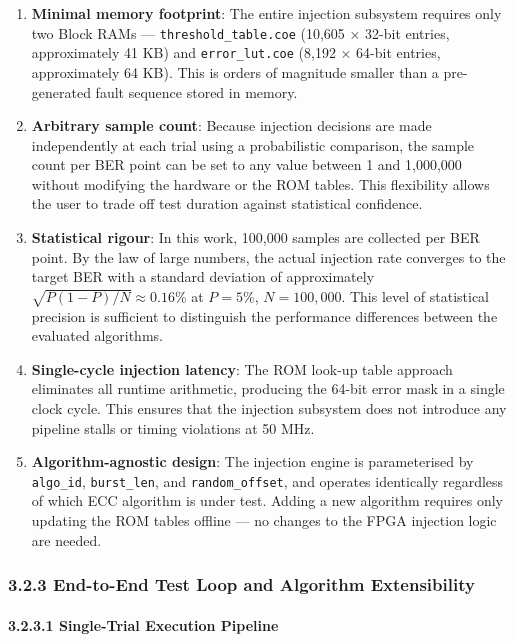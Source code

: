 \begin{enumerate}
\def\labelenumi{\arabic{enumi}.}
\item
  \textbf{Minimal memory footprint}: The entire injection subsystem
  requires only two Block RAMs --- \texttt{threshold\_table.coe} (10,605
  × 32-bit entries, approximately 41 KB) and \texttt{error\_lut.coe}
  (8,192 × 64-bit entries, approximately 64 KB). This is orders of
  magnitude smaller than a pre-generated fault sequence stored in
  memory.
\item
  \textbf{Arbitrary sample count}: Because injection decisions are made
  independently at each trial using a probabilistic comparison, the
  sample count per BER point can be set to any value between 1 and
  1,000,000 without modifying the hardware or the ROM tables. This
  flexibility allows the user to trade off test duration against
  statistical confidence.
\item
  \textbf{Statistical rigour}: In this work, 100,000 samples are
  collected per BER point. By the law of large numbers, the actual
  injection rate converges to the target BER with a standard deviation
  of approximately \(\sqrt{P(1-P)/N} \approx 0.16\%\) at \(P = 5\%\),
  \(N = 100{,}000\). This level of statistical precision is sufficient
  to distinguish the performance differences between the evaluated
  algorithms.
\item
  \textbf{Single-cycle injection latency}: The ROM look-up table
  approach eliminates all runtime arithmetic, producing the 64-bit error
  mask in a single clock cycle. This ensures that the injection
  subsystem does not introduce any pipeline stalls or timing violations
  at 50 MHz.
\item
  \textbf{Algorithm-agnostic design}: The injection engine is
  parameterised by \texttt{algo\_id}, \texttt{burst\_len}, and
  \texttt{random\_offset}, and operates identically regardless of which
  ECC algorithm is under test. Adding a new algorithm requires only
  updating the ROM tables offline --- no changes to the FPGA injection
  logic are needed.
\end{enumerate}

\subsubsection{3.2.3 End-to-End Test Loop and Algorithm
Extensibility}\label{end-to-end-test-loop-and-algorithm-extensibility}

\paragraph{3.2.3.1 Single-Trial Execution
Pipeline}\label{single-trial-execution-pipeline}

